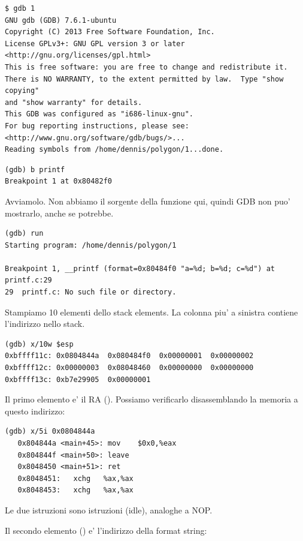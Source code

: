 \begin{lstlisting}
$ gdb 1
GNU gdb (GDB) 7.6.1-ubuntu
Copyright (C) 2013 Free Software Foundation, Inc.
License GPLv3+: GNU GPL version 3 or later <http://gnu.org/licenses/gpl.html>
This is free software: you are free to change and redistribute it.
There is NO WARRANTY, to the extent permitted by law.  Type "show copying"
and "show warranty" for details.
This GDB was configured as "i686-linux-gnu".
For bug reporting instructions, please see:
<http://www.gnu.org/software/gdb/bugs/>...
Reading symbols from /home/dennis/polygon/1...done.
\end{lstlisting}

\begin{lstlisting}[caption=impostiamo un breakpoint su \printf]
(gdb) b printf
Breakpoint 1 at 0x80482f0
\end{lstlisting}

Avviamolo.
Non abbiamo il sorgente della funzione \printf qui, quindi \ac{GDB} non puo' mostrarlo, anche se potrebbe.

\begin{lstlisting}
(gdb) run
Starting program: /home/dennis/polygon/1 

Breakpoint 1, __printf (format=0x80484f0 "a=%d; b=%d; c=%d") at printf.c:29
29	printf.c: No such file or directory.
\end{lstlisting}

Stampiamo 10 elementi dello stack elements. La colonna piu' a sinistra contiene l'indirizzo nello stack.

\begin{lstlisting}
(gdb) x/10w $esp
0xbffff11c:	0x0804844a	0x080484f0	0x00000001	0x00000002
0xbffff12c:	0x00000003	0x08048460	0x00000000	0x00000000
0xbffff13c:	0xb7e29905	0x00000001
\end{lstlisting}

Il primo elemento e' il \ac{RA} ().
Possiamo verificarlo disassemblando la memoria a questo indirizzo:

\begin{lstlisting}[label=NOP_as_XCHG_example]
(gdb) x/5i 0x0804844a
   0x804844a <main+45>:	mov    $0x0,%eax
   0x804844f <main+50>:	leave  
   0x8048450 <main+51>:	ret    
   0x8048451:	xchg   %ax,%ax
   0x8048453:	xchg   %ax,%ax
\end{lstlisting}

Le due istruzioni  sono istruzioni  (idle), analoghe a \ac{NOP}.

Il secondo elemento () e' l'indirizzo della format string:

